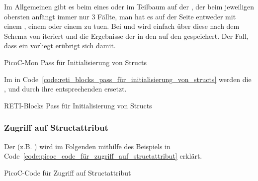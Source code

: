 Im Allgemeinen gibt es beim  eines  oder  im Teilbaum auf der , der beim jeweiligen obersten  anfängt immer nur $3$ Fällte, man hat es auf der  Seite entweder mit einem , einem  oder einem  zu tuen. Bei  und  wird einfach über diese nach dem  Schema von  iteriert und die Ergebnisse der  in den  auf den  gespeichert. Der Fall, dass ein  vorliegt erübrigt sich damit.

\begin{code}
  \centering
  \caption{PicoC-Mon Pass für Initialisierung von Structs}
  \label{code:picoc_mon_pass_für_initialisierung_von_structs}
\end{code}

Im  in Code~\ref{code:reti_blocks_pass_für_initialisierung_von_structs} werden die  ,  und  durch ihre entsprechenden  ersetzt.

\begin{code}
  \centering
  \caption{RETI-Blocks Pass für Initialisierung von Structs}
  \label{code:reti_blocks_pass_für_initialisierung_von_structs}
\end{code}

\subsubsection{Zugriff auf Structattribut}
\label{sec:zugriff_auf_structattribut}

Der  (z.B. ) wird im Folgenden mithilfe des Beispiels in Code~\ref{code:picoc_code_für_zugriff_auf_structattribut} erklärt.

\begin{code}
  \centering
  \caption{PicoC-Code für Zugriff auf Structattribut}
  \label{code:picoc_code_für_zugriff_auf_structattribut}
\end{code}


